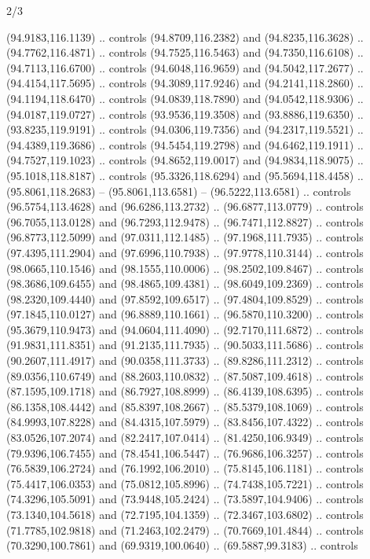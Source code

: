 \begin{flagdescription}{2/3}
\begin{scope}[shift={(0.5\flaglength,0.5)},scale=\flagwidth/320]
\begin{scope}[y=0.8pt, x=0.8pt, yscale=-1,shift={(-118.3,-146)}]
  (94.9183,116.1139) .. controls (94.8709,116.2382) and (94.8235,116.3628) ..
  (94.7762,116.4871) .. controls (94.7525,116.5463) and (94.7350,116.6108) ..
  (94.7113,116.6700) .. controls (94.6048,116.9659) and (94.5042,117.2677) ..
  (94.4154,117.5695) .. controls (94.3089,117.9246) and (94.2141,118.2860) ..
  (94.1194,118.6470) .. controls (94.0839,118.7890) and (94.0542,118.9306) ..
  (94.0187,119.0727) .. controls (93.9536,119.3508) and (93.8886,119.6350) ..
  (93.8235,119.9191) .. controls (94.0306,119.7356) and (94.2317,119.5521) ..
  (94.4389,119.3686) .. controls (94.5454,119.2798) and (94.6462,119.1911) ..
  (94.7527,119.1023) .. controls (94.8652,119.0017) and (94.9834,118.9075) ..
  (95.1018,118.8187) .. controls (95.3326,118.6294) and (95.5694,118.4458) ..
  (95.8061,118.2683) -- (95.8061,113.6581) -- (96.5222,113.6581) .. controls
  (96.5754,113.4628) and (96.6286,113.2732) .. (96.6877,113.0779) .. controls
  (96.7055,113.0128) and (96.7293,112.9478) .. (96.7471,112.8827) .. controls
  (96.8773,112.5099) and (97.0311,112.1485) .. (97.1968,111.7935) .. controls
  (97.4395,111.2904) and (97.6996,110.7938) .. (97.9778,110.3144) .. controls
  (98.0665,110.1546) and (98.1555,110.0006) .. (98.2502,109.8467) .. controls
  (98.3686,109.6455) and (98.4865,109.4381) .. (98.6049,109.2369) .. controls
  (98.2320,109.4440) and (97.8592,109.6517) .. (97.4804,109.8529) .. controls
  (97.1845,110.0127) and (96.8889,110.1661) .. (96.5870,110.3200) .. controls
  (95.3679,110.9473) and (94.0604,111.4090) .. (92.7170,111.6872) .. controls
  (91.9831,111.8351) and (91.2135,111.7935) .. (90.5033,111.5686) .. controls
  (90.2607,111.4917) and (90.0358,111.3733) .. (89.8286,111.2312) .. controls
  (89.0356,110.6749) and (88.2603,110.0832) .. (87.5087,109.4618) .. controls
  (87.1595,109.1718) and (86.7927,108.8999) .. (86.4139,108.6395) .. controls
  (86.1358,108.4442) and (85.8397,108.2667) .. (85.5379,108.1069) .. controls
  (84.9993,107.8228) and (84.4315,107.5979) .. (83.8456,107.4322) .. controls
  (83.0526,107.2074) and (82.2417,107.0414) .. (81.4250,106.9349) .. controls
  (79.9396,106.7455) and (78.4541,106.5447) .. (76.9686,106.3257) .. controls
  (76.5839,106.2724) and (76.1992,106.2010) .. (75.8145,106.1181) .. controls
  (75.4417,106.0353) and (75.0812,105.8996) .. (74.7438,105.7221) .. controls
  (74.3296,105.5091) and (73.9448,105.2424) .. (73.5897,104.9406) .. controls
  (73.1340,104.5618) and (72.7195,104.1359) .. (72.3467,103.6802) .. controls
  (71.7785,102.9818) and (71.2463,102.2479) .. (70.7669,101.4844) .. controls
  (70.3290,100.7861) and (69.9319,100.0640) .. (69.5887,99.3183) .. controls

\end{scope}
\end{scope}
\end{flagdescription}
